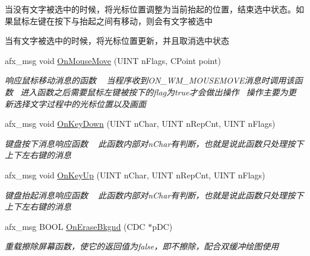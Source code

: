 \begin{DoxyCompactItemize}
\begin{DoxyCompactList}
\begin{DoxyEnumerate}
\item 当没有文字被选中的时候，将光标位置调整为当前抬起的位置，结束选中状态。如果鼠标左键在按下与抬起之间有移动，则会有文字被选中
\item 当有文字被选中的时候，将光标位置更新，并且取消选中状态 
\end{DoxyEnumerate}\end{DoxyCompactList}\item 
afx\+\_\+msg void \hyperlink{class_c_child_view_ad3cb2f8d9fa9a6fb06989513dee5a8bc}{On\+Mouse\+Move} (U\+I\+NT n\+Flags, C\+Point point)
\begin{DoxyCompactList}\small\item\em 响应鼠标移动消息的函数 ~\newline
当程序收到\+O\+N\+\_\+\+W\+M\+\_\+\+M\+O\+U\+S\+E\+M\+O\+V\+E消息时调用该函数~\newline
进入函数之后需要鼠标左键被按下的flag为true才会做出操作~\newline
操作主要为更新选择文字过程中的光标位置以及画面~\newline
\end{DoxyCompactList}\item 
afx\+\_\+msg void \hyperlink{class_c_child_view_a74d87512b76128e2eedea87811363e45}{On\+Key\+Down} (U\+I\+NT n\+Char, U\+I\+NT n\+Rep\+Cnt, U\+I\+NT n\+Flags)
\begin{DoxyCompactList}\small\item\em 键盘按下消息响应函数 ~\newline
此函数内部对n\+Char有判断，也就是说此函数只处理按下上下左右键的消息 \end{DoxyCompactList}\item 
afx\+\_\+msg void \hyperlink{class_c_child_view_afec062448272d8f1e15bcedcb8765abe}{On\+Key\+Up} (U\+I\+NT n\+Char, U\+I\+NT n\+Rep\+Cnt, U\+I\+NT n\+Flags)
\begin{DoxyCompactList}\small\item\em 键盘抬起消息响应函数 ~\newline
此函数内部对n\+Char有判断，也就是说此函数只处理按下上下左右键的消息 \end{DoxyCompactList}\item 
\mbox{\label{class_c_child_view_a6060e6d09d522d345dcee5a01d41c1f0}} 
afx\+\_\+msg B\+O\+OL \hyperlink{class_c_child_view_a6060e6d09d522d345dcee5a01d41c1f0}{On\+Erase\+Bkgnd} (C\+DC $\ast$p\+DC)
\begin{DoxyCompactList}\small\item\em 重载擦除屏幕函数，使它的返回值为false，即不擦除，配合双缓冲绘图使用 \end{DoxyCompactList}\item 

\end{DoxyCompactItemize}
